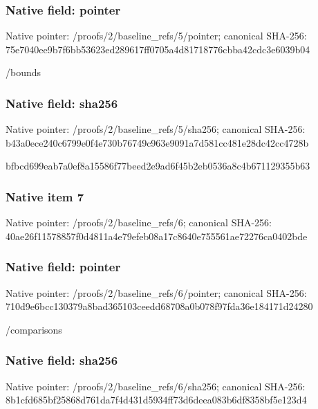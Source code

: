 \documentclass[10pt,a4paper]{article}
\begin{document}
\subsubsection{Native field: pointer}


Native pointer: /proofs/2/baseline\_refs/5/pointer; canonical SHA-256: 75e7040ee9b7f6bb53623ed2\allowbreak{}89617ff0705a4d81718776cb\allowbreak{}ba42cdc3e6039b04


/bounds


\subsubsection{Native field: sha256}


Native pointer: /proofs/2/baseline\_refs/5/sha256; canonical SHA-256: b43a0ece240c6799e0f4e730\allowbreak{}b76749c963e9091a7d581cc4\allowbreak{}81e28dc42cc4728b


bfbcd699eab7a0ef8a15586f\allowbreak{}77beed2e9ad6f45b2eb0536a\allowbreak{}8c4b671129355b63


\subsubsection{Native item 7}


Native pointer: /proofs/2/baseline\_refs/6; canonical SHA-256: 40ae26f11578857f0d4811a4\allowbreak{}e79efeb08a17c8640e755561\allowbreak{}ae72276ca0402bde



\subsubsection{Native field: pointer}


Native pointer: /proofs/2/baseline\_refs/6/pointer; canonical SHA-256: 710d9e6bcc130379a8bad365\allowbreak{}103ceedd68708a0b078f97fd\allowbreak{}a36e184171d24280


/comparisons


\subsubsection{Native field: sha256}


Native pointer: /proofs/2/baseline\_refs/6/sha256; canonical SHA-256: 8b1cfd685bf25868d761da7f\allowbreak{}4d431d5934ff73d6deea083b\allowbreak{}6df8358bf5e123d4
\end{document}
